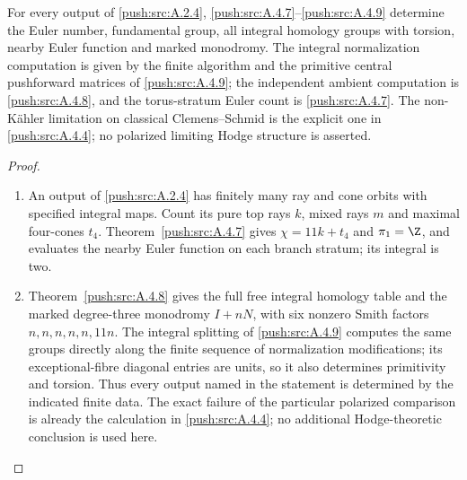 \begin{corollary}\hypertarget{tag-02ZV}{}\label{push:src:A.4.5}\label{push:A45}

For every output of \ref{push:src:A.2.4}, \ref{push:src:A.4.7}--\ref{push:src:A.4.9} determine the
Euler number, fundamental group, all integral homology
groups with torsion, nearby Euler function and marked
monodromy. The integral normalization computation is
given by the finite algorithm and the primitive
central pushforward matrices of \ref{push:src:A.4.9}; the independent
ambient computation is \ref{push:src:A.4.8}, and the torus-stratum
Euler count is \ref{push:src:A.4.7}. The non-K\"ahler limitation on
classical Clemens--Schmid is the explicit one in
\ref{push:src:A.4.4}; no polarized limiting Hodge structure is
asserted.
\end{corollary}

\begin{proof}
\begin{enumerate}[label=\arabic*.,leftmargin=*]
\item An output of \ref{push:src:A.2.4} has finitely many ray and
cone orbits with specified integral maps. Count its pure top
rays $k$, mixed rays $m$ and maximal four-cones $t_4$.
Theorem~\ref{push:src:A.4.7} gives $\chi=11k+t_4$ and
$\pi_1=\Z$, and evaluates the nearby Euler function on
each branch stratum; its integral is two.

\item Theorem~\ref{push:src:A.4.8} gives the full free integral
homology table and the marked degree-three monodromy $I+nN$,
with six nonzero Smith factors $n,n,n,n,n,11n$. The integral
splitting of \ref{push:src:A.4.9} computes the same groups
directly along the finite sequence of normalization modifications;
its exceptional-fibre diagonal entries are units, so it also
determines primitivity and torsion. Thus every output named in
the statement is determined by the indicated finite data.
The exact failure of the particular polarized comparison is
already the calculation in \ref{push:src:A.4.4}; no additional
Hodge-theoretic conclusion is used here.
\end{enumerate}
\end{proof}